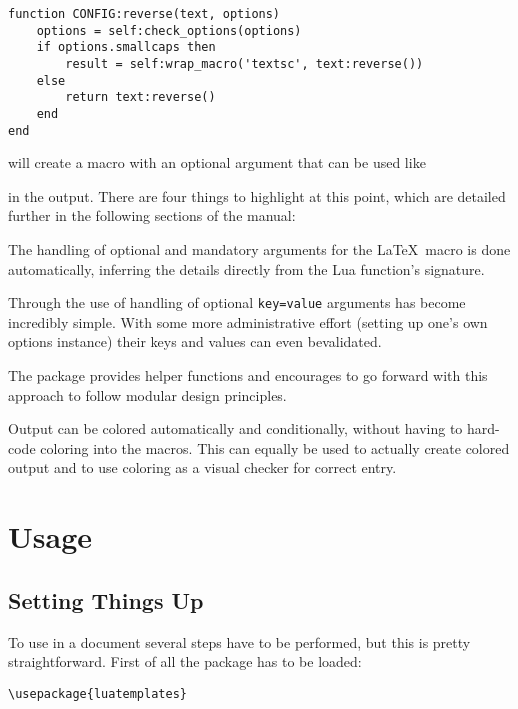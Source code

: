 \documentclass{scrartcl}
\begin{document}
\begin{verbatim}
function CONFIG:reverse(text, options)
    options = self:check_options(options)
    if options.smallcaps then
        result = self:wrap_macro('textsc', text:reverse())
    else
        return text:reverse()
    end
end
\end{verbatim}

\noindent%
will create a macro with an optional argument that can be used like

%
in the output.  There are four things
to highlight at this point, which are detailed further in the following sections
of the manual:

\begin{itemize*}
\item The handling of optional and mandatory arguments for the \LaTeX\ macro is
done automatically, inferring the details directly from the Lua function's signature.
\item Through the use of  handling of optional
\texttt{key=value} arguments has become incredibly simple.  With some more
administrative effort (setting up one's own options instance) their keys and
values can even bevalidated.
\item The package provides helper functions and encourages to go forward with
this approach to follow modular design principles.
\item Output can be colored automatically and conditionally, without having to
hard-code coloring into the macros. This can equally be used to actually create
colored output and to use coloring as a visual checker for correct entry.
\end{itemize*}


\section{Usage}
\label{sec:usage}

\subsection{Setting Things Up}
\label{sec:setup}

To use  in a document several steps have to be performed,
but this is pretty straightforward. First of all the package has to be loaded:

\begin{verbatim}
\usepackage{luatemplates}
\end{verbatim}
\end{document}
